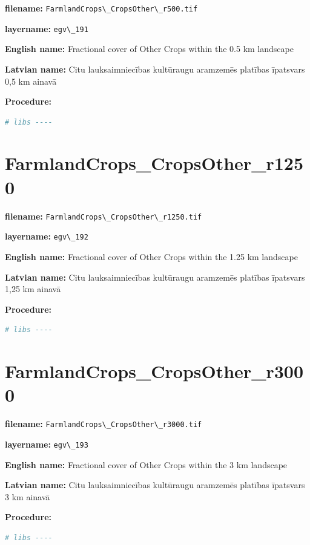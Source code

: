 \documentclass[
]{book}
\newcommand{\passthrough}[1]{#1}
\begin{document}
\textbf{filename:} \passthrough{\lstinline!FarmlandCrops\_CropsOther\_r500.tif!}

\textbf{layername:} \passthrough{\lstinline!egv\_191!}

\textbf{English name:} Fractional cover of Other Crops within the 0.5 km landscape

\textbf{Latvian name:} Citu lauksaimniecības kultūraugu aramzemēs platības īpatsvars 0,5 km ainavā

\textbf{Procedure:}

\begin{lstlisting}[language=R]
# libs ----
\end{lstlisting}

\section{FarmlandCrops\_CropsOther\_r1250}\label{ch06.192}

\textbf{filename:} \passthrough{\lstinline!FarmlandCrops\_CropsOther\_r1250.tif!}

\textbf{layername:} \passthrough{\lstinline!egv\_192!}

\textbf{English name:} Fractional cover of Other Crops within the 1.25 km landscape

\textbf{Latvian name:} Citu lauksaimniecības kultūraugu aramzemēs platības īpatsvars 1,25 km ainavā

\textbf{Procedure:}

\begin{lstlisting}[language=R]
# libs ----
\end{lstlisting}

\section{FarmlandCrops\_CropsOther\_r3000}\label{ch06.193}

\textbf{filename:} \passthrough{\lstinline!FarmlandCrops\_CropsOther\_r3000.tif!}

\textbf{layername:} \passthrough{\lstinline!egv\_193!}

\textbf{English name:} Fractional cover of Other Crops within the 3 km landscape

\textbf{Latvian name:} Citu lauksaimniecības kultūraugu aramzemēs platības īpatsvars 3 km ainavā

\textbf{Procedure:}

\begin{lstlisting}[language=R]
# libs ----
\end{lstlisting}
\end{document}
